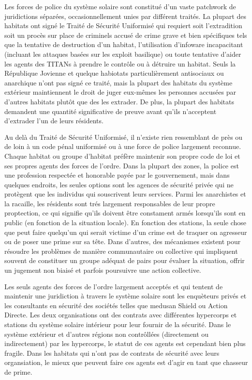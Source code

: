                Les forces de police du système solaire sont constitué d'un vaste patchwork de juridictions séparées, occasionnellement unies par différent traités. La plupart des habitats ont signé le Traité de Sécurité Uniformisé qui requiert soit l'extradition soit un procès sur place de criminels accusé de crime grave et bien spécifiques tels que la tentative de destruction d'un habitat, l'utilisation d'infoware incapacitant (incluant les attaques basées sur les exploit basilique) ou toute tentative d'aider les agents des TITANs à prendre le contrôle ou à détruire un habitat. Seuls la République Jovienne et quelque habiotats particulièrement antisociaux ou anarchique n'ont pas signé ce traité, mais la plupart des habitats du système extérieur maintiennent le droit de juger eux-mêmes les personnes accusées par d'autres habitats plutôt que des les extrader. De plus, la plupart des habitats demandent une quantité significative de preuve avant qu'ils n'acceptent d'extrader l'un de leurs résidents. 

               Au delà du Traité de Sécurité Uniformisé, il n'existe rien ressemblant de près ou de loin à un code pénal uniformisé ou à une force de police largement reconnue. Chaque habitat ou groupe d'habitat préfère maintenir son propre code de loi et ses propres agents des forces de l'ordre. Dans la plupart des zones, la police est une profession respectée et honorable payée par le gouvernement, mais dans quelques endroits, les seules options sont les agences de sécurité privée qui ne protègent que les individus qui souscrivent leurs services. Parmi les anarchistes et la racaille, les résidents sont trés largement responsables de leur propre proptection, ce qui signifie qu'ils doivent être constament armés lorsqu'ils sont en public (en fonction de la situation locale). En fonction des stations, la seule chose que peut faire quelqu'un qui serait victime d'un crime est de traquer on agresseur ou de poser une prime sur sa tête. Dans d'autres, des mécanismes existent pour résoudre les problèmes de manière communautaire ou collective qui impliquent souvent de constituer un groupe adéquat de pairs pour évaluer la situation, offrir un jugement non biaisé et parfois poursuivre une action collective. 

               Les seuls agents des forces de l'ordre largement acceptés et qui tentent de maintenir une juridiction à travers le système solaire sont les enquèteurs privés et les consultants en sécurité des sociétés telles que medusan Shield ou Action Directe. Les deux organisations ont des contrats avec différentes hypercorps et stations du système solaire intérieur pour leur fournir de la sécurité. Dans le système extérieur et d'autres régions non contrôllées (directement ou indirectement) par les hypercorps, le statut de ces agents est cependant bien plus fragile. Dans les habitats qui n'ont pas de contrats de sécurité avec leurs organsiation, le mieux que peuvent faire ces agents est d'agir en tant que chasseur de prime. 

